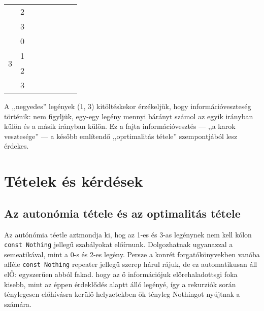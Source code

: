 \documentclass{article}
\newcommand{\blk}{\cellcolor{darkgray}}
\newcommand{\red}{\cellcolor{red!33}}
\newcommand{\grn}{\cellcolor{green!33}}
\newcommand{\just}[1]{\boxed{#1}}%
\newcommand{\incl}{\mathbf{incl}}
\newcommand{\excl}{\mathbf{excl}}
\begin{document}
\begin{table}[H]
\begin{tabular}{c|c|c|c|c|c|c|c|}
				               &  2                        &    \blk           & \blk           & \red\just\excl & \grn\just\incl & \blk           & \blk           \\\cline{2-8}
				               &  3                        &    \blk           & \blk           & \red\just\excl & \grn\just\incl & \blk           & \blk           \\\hline\hline
			\multirow{4}{*}{3}     &  0                        &    \blk           & \blk           & \blk           & \blk           & \blk           & \blk           \\\cline{2-8}
				               &  1                        &    \blk           & \blk           & \blk           & \blk           & \blk           & \blk           \\\cline{2-8}
				               &  2                        &    \blk           & \blk           & \blk           & \blk           & \blk           & \blk           \\\cline{2-8}
				               &  3                        &    \blk           & \blk           & \blk           & \blk           & \blk           & \blk           \\\hline
		\end{tabular}
	\end{table}

	A ,,negyedes'' legények (1, 3) kitöltéskekor érzékeljük, hogy információveszteség történik: nem figyljük, egy-egy legény mennyi bárányt számol az egyik irányban külön és a másik irányban külön.
	Ez a fajta információvesztés --- ,,a karok vesztesége'' --- a később említendő ,,oprtimalitás tétele'' szempontjából lesz érdekes.

	\section{Tételek és kérdések}

	\subsection{Az autonómia tétele és az optimalitás tétele}

	Az autónómia téetle aztmondja ki, hog az 1-es és 3-as legénynek nem kell kólon \texttt{const Nothing} jellegű szabályokat előírnunk.
	Dolgozhatnak ugyanazzal a semeatikával, mint a 0-s és 2-es legény. Persze a konrét forgatókönyvekben vanóba afféle \texttt{const Nothing} repeater jellegű szerep hárul rájuk,
	de ez automatikusan áll elŐ: egyszerűen abból fakad. hogy az ő információjuk előrehaladottsgi foka kisebb, mint az éppen érdeklődés alaptt álló legényé, így a rekurziók során ténylegesen előhívásra kerülő helyzetekben ők tényleg Nothingot nyújtnak a számára.
\end{document}
